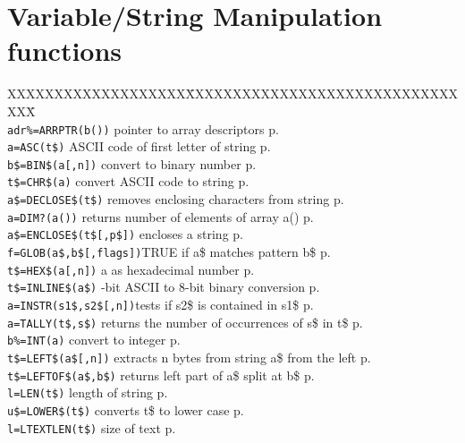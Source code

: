 \section{Variable/String Manipulation functions}
\begin{tabbing}
XXXXXXXXXXXXXXXXXXX\=XXXXXXXXXXXXXXXXXXXXXXXXXXXXXXXX\=\kill\\
\verb|adr%=ARRPTR(b())|  	\> pointer to array descriptors\> p.\pageref{ARRPTR}\\
\verb|a=ASC(t$)|	\> ASCII code of first letter of string\> p.\pageref{ASC}\\
\verb|b$=BIN$(a[,n])|  	\> convert to binary number\> p.\pageref{BINS}\\
\verb|t$=CHR$(a)|	\> convert ASCII code to string\> p.\pageref{CHRS}\\
\verb|a$=DECLOSE$(t$)| \> removes enclosing characters from string\> p.\pageref{DECLOSES}\\
\verb|a=DIM?(a())|	\>  returns number of elements of array a()\> p.\pageref{DIMf}\\
\verb|a$=ENCLOSE$(t$[,p$])| \> encloses a string\> p.\pageref{ENCLOSES}\\
\verb|f=GLOB(a$,b$[,flags])|\>TRUE if a\$ matches pattern b\$\> p.\pageref{GLOB}\\
\verb|t$=HEX$(a[,n])|  	\>a as hexadecimal number\> p.\pageref{HEXS}\\
\verb|t$=INLINE$(a$)|  	-bit ASCII to 8-bit binary conversion\> p.\pageref{INLINES}\\
\verb|a=INSTR(s1$,s2$[,n])|\>tests if s2\$ is contained in s1\$\> p.\pageref{INSTR}\\
\verb|a=TALLY(t$,s$)|\> returns the number of occurrences of s\$ in t\$\> p.\pageref{TALLY}\\
\verb|b%=INT(a)|		\> convert to integer\> p.\pageref{INT}\\
\verb|t$=LEFT$(a$[,n])|  	\>extracts n bytes from string a\$ from the left\> p.\pageref{LEFTS}\\
\verb|t$=LEFTOF$(a$,b$)| \>  returns left part of a\$ split at b\$\> p.\pageref{LEFTOFS}\\
\verb|l=LEN(t$)|	\>length of string\> p.\pageref{LEN}\\
\verb|u$=LOWER$(t$)| \>	     converts t\$ to lower case\> p.\pageref{LOWERS}\\
\verb|l=LTEXTLEN(t$)|	\>size of text\> p.\pageref{LTEXTLEN}\\

\end{tabbing}
